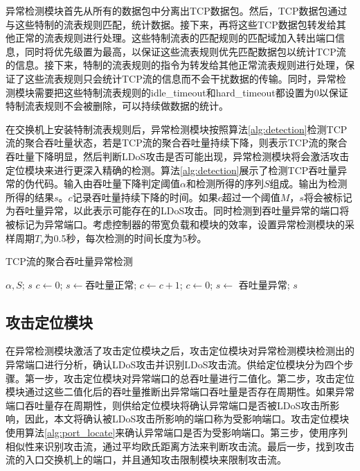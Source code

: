 异常检测模块首先从所有的数据包中分离出TCP数据包。然后，TCP数据包通过与这些特制的流表规则匹配，统计数据。接下来，再将这些TCP数据包转发给其他正常的流表规则进行处理。这些特制流表的匹配规则的匹配域加入转出端口信息，同时将优先级置为最高，以保证这些流表规则优先匹配数据包以统计TCP流的信息。接下来，特制的流表规则的指令为转发给其他正常流表规则进行处理，保证了这些流表规则只会统计TCP流的信息而不会干扰数据的传输。同时，异常检测模块需要把这些特制流表规则的idle\_timeout和hard\_timeout都设置为0以保证特制流表规则不会被删除，可以持续做数据的统计。

在交换机上安装特制流表规则后，异常检测模块按照算法\ref{alg:detection}检测TCP流的聚合吞吐量状态，若是TCP流的聚合吞吐量持续下降，则表示TCP流的聚合吞吐量下降明显，然后判断LDoS攻击是否可能出现，异常检测模块将会激活攻击定位模块来进行更深入精确的检测。算法\ref{alg:detection}展示了检测TCP吞吐量异常的伪代码。输入由吞吐量下降判定阈值$\alpha$和检测所得的序列$S$组成。输出为检测所得的结果$s$。$c$记录吞吐量持续下降的时间。如果$c$超过一个阈值$M$，$s$将会被标记为吞吐量异常，以此表示可能存在的LDoS攻击。同时检测到吞吐量异常的端口将被标记为异常端口。考虑控制器的带宽负载和模块的效率，设置异常检测模块的采样周期$T_s$为0.5秒，每次检测的时间长度为5秒。

\renewcommand{\algorithmicrequire}{\textbf{输入:}}
\renewcommand{\algorithmicensure}{\textbf{输出:}}
\begin{algorithm}
	\small
	\caption{TCP流的聚合吞吐量异常检测}
	\label{alg:detection}
	\begin{algorithmic}[1]%
	\Require $\alpha, S$;
	\Ensure $s$
	\State $c \gets 0$;
	\State $s \gets $吞吐量正常;
			\State $c \gets c + 1$;
		\Else 
			\State $c \gets 0$;
		\EndIf
			\State $s \gets$ 吞吐量异常;
		\EndIf
	\EndFor
	\State \Return $s$
		
	\end{algorithmic}
\end{algorithm}

\subsection{攻击定位模块}
\label{chap4:Locator}

在异常检测模块激活了攻击定位模块之后，攻击定位模块对异常检测模块检测出的异常端口进行分析，确认LDoS攻击并识别LDoS攻击流。供给定位模块分为四个步骤。第一步，攻击定位模块对异常端口的总吞吐量进行二值化。第二步，攻击定位模块通过这些二值化后的吞吐量推断出异常端口吞吐量是否存在周期性。如果异常端口吞吐量存在周期性，则供给定位模块将确认异常端口是否被LDoS攻击所影响，因此，本文将确认被LDoS攻击所影响的端口称为受影响端口。攻击定位模块使用算法\ref{alg:port_locate}来确认异常端口是否为受影响端口。第三步，使用序列相似性来识别攻击流，通过平均欧氏距离方法来判断攻击流。最后一步，找到攻击流的入口交换机上的端口，并且通知攻击限制模块来限制攻击流。




